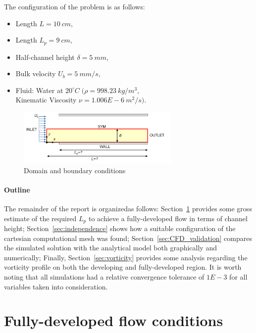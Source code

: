 \documentclass[12pt]{article}
\begin{document}
        The configuration of the problem is as follows:
        \begin{itemize}
                \item Length \( L = 10 \: cm \),
                \item Length \( L_p = 9 \: cm \),
                \item Half-channel height \(\delta = 5 \: mm\),
                \item Bulk velocity \( U_b = 5 \: mm/s \),
                \item Fluid: Water at \( 20^{\circ}C \; ( \rho = 998.23 \: kg/m^3\), \\ Kinematic Viscosity \( \nu = 1.006E-6 \: m^2/s ) \).
        \end{itemize}

        \begin{figure}[!ht]
                \includegraphics[width=0.7\textwidth]{Conditions.png}
                \centering
                \caption{Domain and boundary conditions}
                \label{fig:conditions}
        \end{figure}

        \paragraph{Outline}
        The remainder of the report is organizedas follows: Section~\ref{sec:developed_flow} provides some gross estimate of the required \( L_p \) to achieve a fully-developed flow in terms of channel height; Section~\ref{sec:independence} shows how a suitable configuration of the cartesian computational mesh was found; Section~\ref{sec:CFD_validation} compares the simulated solution with the analytical model both graphically and numerically; Finally, Section~\ref{sec:vorticity} provides some analysis regarding the vorticity profile on both the developing and fully-developed region. It is worth noting that all simulations had a relative convergence tolerance of $ 1E-3 $ for all variables taken into consideration.

\section{Fully-developed flow conditions} \label{sec:developed_flow}
\end{document}
